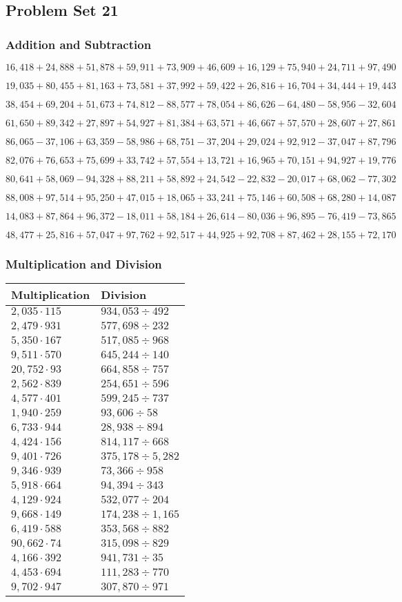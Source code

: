 \hypertarget{problem-set-21-4}{%
\subsection{Problem Set 21}\label{problem-set-21-4}}

\hypertarget{addition-and-subtraction-243}{%
\subsubsection{Addition and
Subtraction}\label{addition-and-subtraction-243}}

\(16,418+24,888+51,878+59,911+73,909+46,609+16,129+75,940+24,711+ 97,490\)

\(19,035+80,455+81,163+73,581+37,992+59,422+26,816+16,704+34,444+19,443\)

\(38,454+69,204+51,673+74,812-88,577+78,054+86,626-64,480-58,956-32,604\)

\(61,650+89,342+27,897+54,927+81,384+63,571+46,667+57,570+28,607+27,861\)

\(86,065-37,106+63,359-58,986+68,751-37,204+29,024+92,912-37,047+87,796\)

\(82,076+76,653+75,699+33,742+57,554+13,721+16,965+70,151+94,927+19,776\)

\(80,641+58,069-94,328+88,211+58,892+24,542-22,832-20,017+68,062-77,302\)

\(88,008+97,514+95,250+47,015+18,065+33,241+75,146+60,508+68,280+14,087\)

\(14,083+87,864+96,372-18,011+58,184+26,614-80,036+96,895-76,419-73,865\)

\(48,477+25,816+57,047+97,762+92,517+44,925+92,708+87,462+28,155+72,170\)

\hypertarget{multiplication-and-division-242}{%
\subsubsection{Multiplication and
Division}\label{multiplication-and-division-242}}

\begin{longtable}[]{@{}ll@{}}
\toprule
Multiplication & Division\tabularnewline
\midrule
\endhead
\(2,035\cdot115\) & \(934,053÷492\)\tabularnewline
\(2,479\cdot931\) & \(577,698÷ 232\)\tabularnewline
\(5,350\cdot167\) & \(517,085÷968\)\tabularnewline
\(9,511\cdot570\) & \(645,244÷140\)\tabularnewline
\(20,752\cdot93\) & \(664,858÷757\)\tabularnewline
\(2,562\cdot839\) & \(254,651÷596\)\tabularnewline
\(4,577\cdot401\) & \(599,245÷737\)\tabularnewline
\(1,940\cdot259\) & \(93,606÷58\)\tabularnewline
\(6,733\cdot944\) & \(28,938÷894\)\tabularnewline
\(4,424\cdot156\) & \(814,117÷668\)\tabularnewline
\(9,401\cdot726\) & \(375,178÷5,282\)\tabularnewline
\(9,346\cdot939\) & \(73,366÷958\)\tabularnewline
\(5,918\cdot664\) & \(94,394÷343\)\tabularnewline
\(4,129\cdot924\) & \(532,077÷204\)\tabularnewline
\(9,668\cdot149\) & \(174,238÷1,165\)\tabularnewline
\(6,419\cdot588\) & \(353,568÷882\)\tabularnewline
\(90,662\cdot74\) & \(315,098÷829\)\tabularnewline
\(4,166\cdot392\) & \(941,731÷35\)\tabularnewline
\(4,453\cdot694\) & \(111,283÷770\)\tabularnewline
\(9,702\cdot947\) & \(307,870÷971\)\tabularnewline
\bottomrule
\end{longtable}

